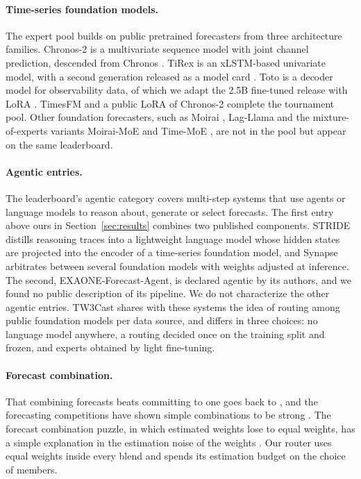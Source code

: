 \documentclass[11pt]{article}
\begin{document}
\paragraph{Time-series foundation models.} The expert pool builds on
public pretrained forecasters from three architecture families. Chronos-2
\citep{ansari2025chronos2} is a multivariate sequence model with joint
channel prediction, descended from Chronos \citep{ansari2024chronos}.
TiRex \citep{auer2025tirex} is an xLSTM-based univariate model, with a
second generation released as a model card \citep{tirex2card}. Toto
\citep{cohen2025toto} is a decoder model for observability data, of which
we adapt the 2.5B fine-tuned release \citep{toto2card} with LoRA
\citep{hu2021lora}. TimesFM \citep{das2024timesfm,timesfm25card} and a
public LoRA of Chronos-2 \citep{turkforecast} complete the tournament
pool. Other foundation forecasters, such as Moirai \citep{woo2024moirai},
Lag-Llama \citep{rasul2023lagllama} and the mixture-of-experts variants
Moirai-MoE \citep{liu2024moiraimoe} and Time-MoE \citep{shi2025timemoe},
are not in the pool but appear on the same leaderboard. 

\paragraph{Agentic entries.} The leaderboard's agentic category covers
multi-step systems that use agents or language models to reason about,
generate or select forecasts. The first entry above ours in Section~\ref{sec:results} combines two
published components. STRIDE \citep{ahamed2026stride} distills reasoning
traces into a lightweight language model whose hidden states are
projected into the encoder of a time-series foundation model, and Synapse
\citep{das2025synapse} arbitrates between several foundation models with
weights adjusted at inference. The second, EXAONE-Forecast-Agent, is
declared agentic by its authors, and we found no public description of
its pipeline. We do not characterize the other agentic entries. TW3Cast
shares with these systems the idea of routing among
public foundation models per data source, and differs in three choices: no language model anywhere, a routing
decided once on the training split and frozen, and experts obtained by
light fine-tuning.

\paragraph{Forecast combination.} That combining forecasts beats
committing to one goes back to \citet{bates1969combination}, and the
forecasting competitions have shown simple combinations to be strong
\citep{makridakis2020m4,makridakis2022m5,timmermann2006combinations}.
The forecast combination puzzle, in which estimated weights lose to equal
weights, has a simple explanation in the estimation noise of the weights
\citep{smith2009puzzle,claeskens2016puzzle}. Our router uses equal weights inside every blend and spends its
estimation budget on the choice of members.
\end{document}
